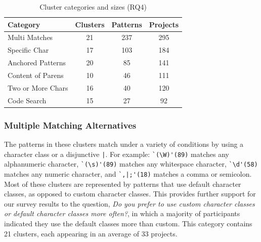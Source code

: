 
\begin{table}
\begin{center}
\begin{small}

\caption{Cluster categories and sizes (RQ4) \label{tab:clustercats}}
\begin{tabular}{lccc}
\toprule
\textbf{Category} & \textbf{Clusters} & \textbf{Patterns} & \textbf{Projects} \\  \hline \bigstrut
Multi Matches & 21 & 237 & 295\\
\hline \bigstrut
Specific Char & 17 & 103 & 184\\
\hline \bigstrut
Anchored Patterns & 20 & 85 & 141\\
\hline \bigstrut
 Content of Parens & 10 & 46 & 111\\
\hline \bigstrut
Two or More Chars & 16 & 40 & 120\\
\hline \bigstrut
Code Search & 15 & 27 & 92 \\
\bottomrule
\end{tabular}
\vspace{-12pt}
\end{small}
\end{center}
\end{table}

\subsubsection{Multiple Matching Alternatives}
The patterns in these clusters match under a variety of conditions by using a character class or a disjunctive \verb!|!.
For example:
\verb!`(\W)'(89)! matches any alphanumeric character, \verb!`(\s)'(89)! matches any whitespace character, \verb!`\d'(58)! matches any numeric character, and \verb!`,|;'(18)! matches a comma or semicolon.  Most of these clusters are represented by patterns that use default character classes, as opposed to custom character classes.  This provides further support for our survey results to the question, \emph{Do you prefer to use custom character classes or default character classes more often?}, in which a majority of participants indicated they use the default classes more than custom.
This category contains 21 clusters, each appearing in an average of 33 projects.  

